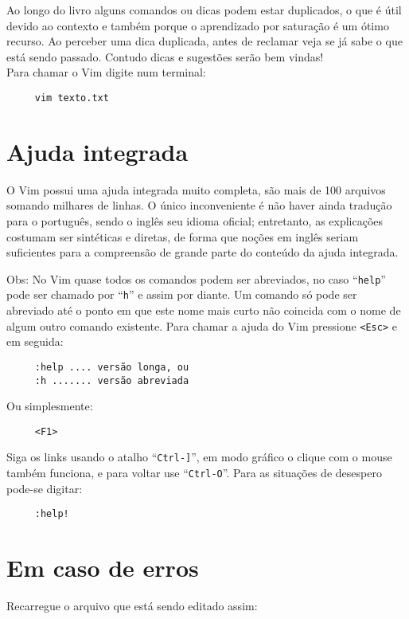 Ao longo do livro alguns comandos ou dicas podem estar duplicados, o que
é útil devido ao contexto e também porque o aprendizado por saturação
é um ótimo recurso. Ao perceber uma dica duplicada, antes de
reclamar veja se já sabe o que está sendo passado. Contudo dicas e sugestões serão bem vindas! \\

Para chamar o Vim digite num terminal:

\begin{verbatim}
     vim texto.txt
\end{verbatim}

\section{Ajuda integrada}

O Vim possui uma ajuda integrada muito completa, são mais de 100 arquivos
somando milhares de linhas. O único inconveniente é não haver ainda tradução
para o português, sendo o inglês seu idioma oficial; entretanto, as explicações
costumam ser sintéticas e diretas, de forma que noções em inglês seriam
suficientes para a compreensão de grande parte do conteúdo da ajuda integrada.

Obs: No Vim quase todos os comandos podem ser abreviados, no caso
``\verb+help+'' pode ser chamado por ``\verb+h+'' e assim por diante. Um
comando só pode ser abreviado até o ponto em que este nome mais curto não
coincida com o nome de algum outro comando existente.  Para chamar a ajuda do
Vim pressione \verb|<Esc>| e em seguida:

\begin{verbatim}
     :help .... versão longa, ou
     :h ....... versão abreviada
\end{verbatim}

Ou simplesmente:

\begin{verbatim}
     <F1>
\end{verbatim}

Siga os links usando o atalho ``\verb|Ctrl-]|'', em modo gráfico o clique com o
mouse também funciona, e para voltar use ``\verb|Ctrl-O|''. Para as situações
de desespero pode-se digitar:

\begin{verbatim}
     :help!
\end{verbatim}

\section{Em caso de erros }\label{Em caso de erros }
Recarregue o arquivo que está sendo editado assim:

